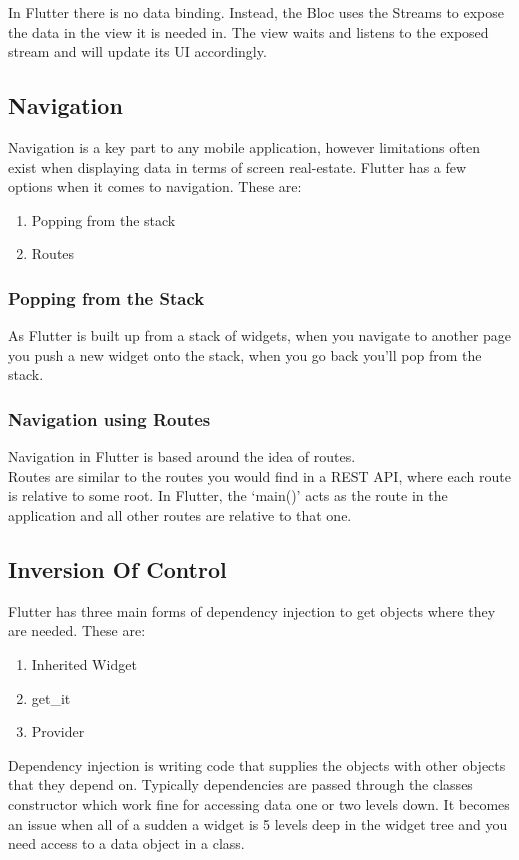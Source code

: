 In Flutter there is no data binding. Instead, the Bloc uses the Streams to expose the data in the view it is needed in. The view waits and listens to the exposed stream and will update its UI accordingly. 

\subsection{Navigation}
Navigation is a key part to any mobile application, however limitations often exist when displaying data in terms of screen real-estate.  Flutter has a few options when it comes to navigation. These are:
\begin{enumerate}
    \item Popping from the stack
    \item Routes
\end{enumerate}

\subsubsection{Popping from the Stack}
As Flutter is built up from a stack of widgets, when you navigate to another page you push a new widget onto the stack, when you go back you'll pop from the stack. 

\subsubsection{Navigation using Routes}
Navigation in Flutter is based around the idea of routes. 
\\ Routes are similar to the routes you would find in a REST API, where each route is relative to some root. In Flutter, the ‘main()’ acts as the route in the application and all other routes are relative to that one. 

\subsection{Inversion Of Control}
Flutter has three main forms of dependency injection to get objects where they are needed. These are:
\begin{enumerate}
    \item Inherited Widget
    \item get\_it
    \item Provider
\end{enumerate}

Dependency injection is writing code that supplies the objects with other objects that they depend on. Typically dependencies are passed through the classes constructor which work fine for accessing data one or two levels down. It becomes an issue when all of a sudden a widget is 5 levels deep in the widget tree and you need access to a data object in a class. 

